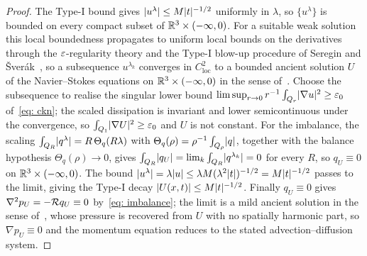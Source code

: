\begin{proof}
The Type-I bound gives $\lvert u^\lambda \rvert \le M\lvert t \rvert^{-1/2}$ uniformly in
$\lambda$, so $\{u^\lambda\}$ is bounded on every compact subset of
$\mathbb{R}^3\times(-\infty,0)$. For a suitable weak solution this local boundedness
propagates to uniform local bounds on the derivatives through the
$\varepsilon$-regularity theory and the Type-I blow-up procedure of Seregin and
\v{S}ver\'ak~\cite{seregin-2009-typ-i-sin, necas-1996-ler-sel-sol,
caffarelli-1982-par-reg-sui}, so a subsequence $u^{\lambda_k}$ converges in
$C^2_{\mathrm{loc}}$ to a bounded ancient solution $U$ of the Navier--Stokes
equations on $\mathbb{R}^3\times(-\infty,0)$ in the sense of~\cite{koch-2009-lio-the-nav}.
Choose the subsequence to realise the singular lower bound
$\limsup_{r\to0} r^{-1}\int_{Q_r}\lvert \nabla u \rvert^2 \ge \varepsilon_0$ of~\eqref{eq: ckn};
the scaled dissipation is invariant and lower semicontinuous under the
convergence, so $\int_{Q_1}\lvert \nabla U \rvert^2 \ge \varepsilon_0$ and $U$ is not constant.
For the imbalance, the scaling
$\int_{Q_R}\lvert q^\lambda \rvert = R\,\Theta_q(R\lambda)$ with
$\Theta_q(\rho) = \rho^{-1}\int_{Q_\rho}\lvert q \rvert$, together with the balance
hypothesis $\Theta_q(\rho)\to0$, gives
$\int_{Q_R}\lvert q_U \rvert = \lim_k \int_{Q_R}\lvert q^{\lambda_k} \rvert = 0$ for every $R$, so
$q_U\equiv0$ on $\mathbb{R}^3\times(-\infty,0)$. The bound
$\lvert u^\lambda \rvert = \lambda\lvert u \rvert \le \lambda M(\lambda^2\lvert t \rvert)^{-1/2}
= M\lvert t \rvert^{-1/2}$ passes to the limit, giving the Type-I decay
$\lvert U(x,t) \rvert \le M\lvert t \rvert^{-1/2}$. Finally $q_U\equiv0$ gives
$\nabla^2 p_U = -\mathcal{R} q_U \equiv 0$ by~\eqref{eq: imbalance}; the limit is a mild
ancient solution in the sense of~\cite{koch-2009-lio-the-nav}, whose pressure is
recovered from $U$ with no spatially harmonic part, so $\nabla p_U\equiv0$ and the
momentum equation reduces to the stated advection--diffusion system.
\end{proof}

